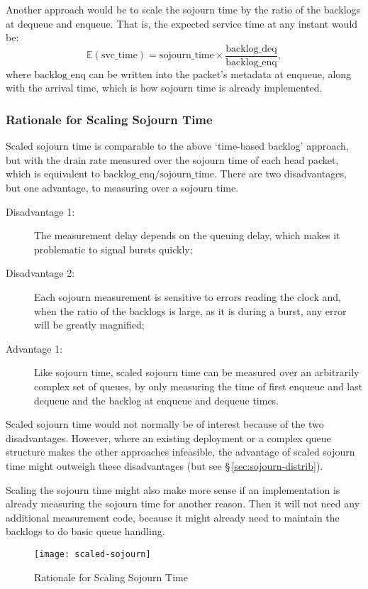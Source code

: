 Another approach would be to scale the sojourn time by the ratio of the backlogs at dequeue and enqueue. That is, the expected service time at any instant would be:
\[\mathbb{E}(\mathrm{svc\_time}) = \mathrm{sojourn\_time} \times \frac{\mathrm{backlog\_deq}}{\mathrm{backlog\_enq}},\]
where \(\mathrm{backlog\_enq}\) can be written into the packet's metadata at enqueue, along with the arrival time, which is how sojourn time is already implemented.

\subsubsection{Rationale for Scaling Sojourn Time}\label{sec:inst_svc_time_justify}

Scaled sojourn time is comparable to the above `time-based backlog' approach, but with the drain rate measured over the sojourn time of each head packet, which is equivalent to \(\mathrm{backlog\_enq}/\mathrm{sojourn\_time}\). There are two disadvantages, but one advantage, to measuring over a sojourn time.
\begin{description}
	\item[Disadvantage 1:] The measurement delay depends on the queuing delay, which makes it problematic to signal bursts quickly;
	\item[Disadvantage 2:] Each sojourn measurement is sensitive to errors reading the clock and, when the ratio of the backlogs is large, as it is during a burst, any error will be greatly magnified;
	\item[Advantage 1:] Like sojourn time, scaled sojourn time can be measured over an arbitrarily complex set of queues, by only measuring the time of first enqueue and last dequeue and the backlog at enqueue and dequeue times.
\end{description}

Scaled sojourn time would not normally be of interest because of the two disadvantages. However, where an existing deployment or a complex queue structure makes the other approaches infeasible, the advantage of scaled sojourn time might outweigh these disadvantages (but see \S\,\ref{sec:sojourn-distrib}).

Scaling the sojourn time might also make more sense if an implementation is already measuring the sojourn time for another reason. Then it will not need any additional measurement code, because it might already need to maintain the backlogs to do basic queue handling.

\begin{figure}[h]
	\centering
	\texttt{[image: scaled-sojourn]}
	\caption{Rationale for Scaling Sojourn Time}\label{fig:scaled-sojourn}
\end{figure}


